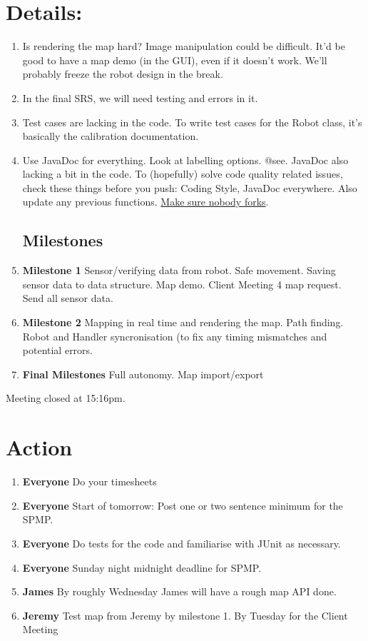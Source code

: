 \documentclass{article}
\begin{document}
\section{Details:}
\begin{enumerate}
\item Is rendering the map hard? Image manipulation could be difficult. It'd be good to have a map demo (in the GUI), even if it doesn't work. We'll probably freeze the robot design in the break.
\item In the final SRS, we will need testing and errors in it.
\item Test cases are lacking in the code. To write test cases for the Robot class, it's basically the calibration documentation.
\item Use JavaDoc for everything. Look at labelling options. @see. JavaDoc also lacking a bit in the code. To (hopefully) solve code quality related issues, check these things before you push: Coding Style, JavaDoc everywhere. Also update any previous functions. \underline{Make sure nobody forks}.
\subsection{Milestones}
\item \textbf{Milestone 1} Sensor/verifying data from robot. Safe movement. Saving sensor data to data structure. Map demo. Client Meeting 4 map request. Send all sensor data. 
\item \textbf{Milestone 2} Mapping in real time and rendering the map. Path finding. Robot and Handler syncronisation (to fix any timing mismatches and potential errors.
\item \textbf{Final Milestones} Full autonomy. Map import/export

\end{enumerate}
Meeting closed at 15:16pm.


\section{Action}
\begin{enumerate}
\item \textbf{Everyone} Do your timesheets
\item \textbf{Everyone} Start of tomorrow: Post one or two sentence minimum for the SPMP.
\item \textbf{Everyone} Do tests for the code and familiarise with JUnit as necessary.
\item \textbf{Everyone} Sunday night midnight deadline for SPMP.
\item \textbf{James} By roughly Wednesday James will have a rough map API done.
\item \textbf{Jeremy} Test map from Jeremy by milestone 1. By Tuesday for the Client Meeting
\end{enumerate}
\end{document}
